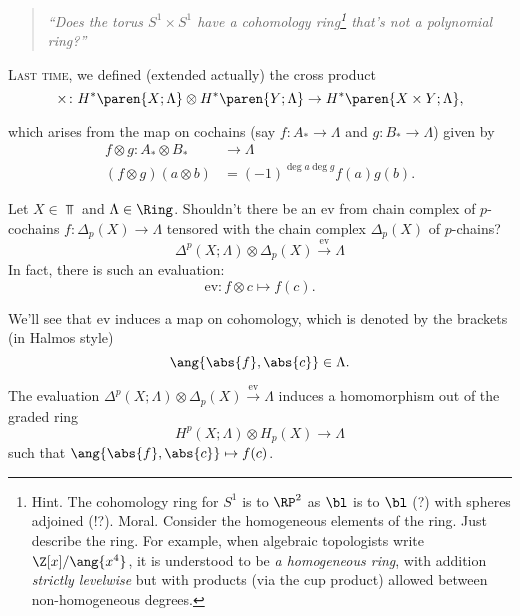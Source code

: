 \begin{quote}
   \textit{``Does the torus $S^1 \times S^1$ have a cohomology ring\footnote{\textsf{Hint.} The cohomology ring for $S^1$ is to $\RP^2$ as $\bl$ is to $\bl$ (?) with spheres adjoined (!?). \textsf{Moral.} Consider the homogeneous elements of the ring. Just describe the ring. For example, when algebraic topologists write $\Z[x]/\ang{x^4}$, it is understood to be \emph{a homogeneous ring}, with addition \emph{strictly levelwise} but with products (via the cup product) allowed between non-homogeneous degrees.} 
   that's not a polynomial ring?''}
\end{quote}


\newcommand{\coho}[2]{H^*\paren{ #1; #2 }}

\textsc{Last time}, we defined (extended actually) the cross product
\[
    \times \colon H^*\paren{ X; \Lambda } \otimes \coho{Y}{\Lambda} \to \coho{X\times Y}{\Lambda}
,\]

which arises from the map on cochains (say $f\colon A_* \to \Lambda$ and $g\colon B_* \to \Lambda$) given by
\begin{align*}
    f \otimes g \colon  A_* \otimes B_* & \to \Lambda\\
    (f \otimes g)(a \otimes b) &= (-1)^{\deg a \deg g} f(a) g(b).
\end{align*}

\renewcommand{\ev}{\mathrm{ev}}

\begin{defn}
   Let $X \in \Top$ and $\Lambda \in \Ring$. Shouldn't there be an  $\ev$ from chain complex of $p$-cochains $f \colon \Delta_p(X) \to \Lambda$ tensored with the chain complex $\Delta_p(X)$ of $p$-chains? 
    \[
        \Delta^p(X; \Lambda) \otimes \Delta_p(X) \xrightarrow{\ev} \Lambda
    \]
    In fact, there is such an evaluation:
    \[
     \ev\colon f \otimes c \mapsto f(c).
    \] 
\end{defn}

We'll see that $\ev$ induces a map on cohomology, which is denoted by the brackets (in Halmos style) 
\[
   \ang{\abs{f}, \abs{ c }} \in \Lambda.
\]

\begin{lem}
   The evaluation $\Delta^p(X; \Lambda) \otimes \Delta_p(X) \xrightarrow{\ev} \Lambda$ induces a homomorphism out of the graded ring
   \begin{equation}
       \label{kpairing}
       H^p(X;\Lambda) \otimes H_p(X) \to \Lambda
   \end{equation}
   such that $\ang{\abs{f}, \abs{ c }}\mapsto f(c)$.
\end{lem}

